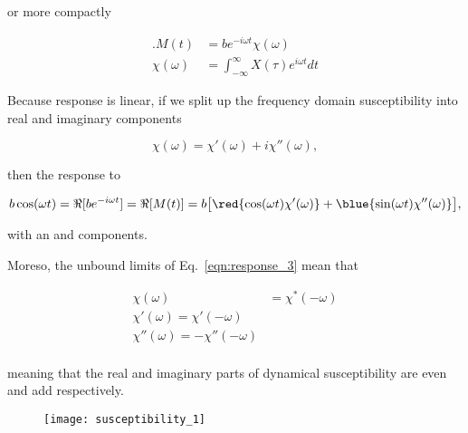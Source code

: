  \noindent or more compactly
 \begin{framed}\noindent

   \begin{equation}\label{eqn:response_3}
     \begin{aligned}.M(t) &= be^{-i\omega t}\chi(\omega)\\ \chi(\omega) &= \int_{-\infty}^{\infty}X(\tau)e^{i\omega t}dt
     \end{aligned}
   \end{equation}

 \end{framed}

 \noindent Because  response is  linear, if we  split up  the frequency
 domain susceptibility into real and imaginary components

  \begin{equation}
    \chi(\omega) = \chi'(\omega) + i\chi''(\omega),
  \end{equation}

  \noindent then the response to

  \begin{equation}\label{eqn:response_4}
    b\cos(\omega t) = \Re[be^{-i\omega t}]  =\Re[M(t)] = b\big[\red{\cos(\omega t)\chi'(\omega)} + \blue{\sin(\omega t)\chi''(\omega)}\big],
  \end{equation}

  \noindent with an  and  components.

  Moreso, the unbound limits of Eq.~\eqref{eqn:response_3} mean that

  \begin{equation}
    \begin{aligned}
      \chi(\omega) & = \chi^{*}(-\omega)\\
      \chi'(\omega) = \chi'(-\omega)\\
      \chi''(\omega) = -\chi''(-\omega)\\
    \end{aligned}
  \end{equation}

  \noindent  meaning that  the real  and imaginary  parts of  dynamical
  susceptibility are even and add respectively.

\begin{figure}[h]
  \centering \texttt{[image: susceptibility\_1]}
\end{figure}

